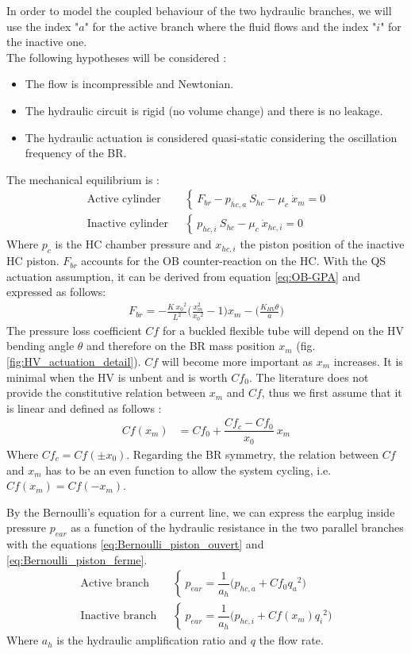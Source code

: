 \documentclass[3p,twocolumn,preprint]{elsarticle}
\begin{document}
In order to model the coupled behaviour of the two hydraulic branches, we will use the index "$a$" for the active branch where the fluid flows and the index "$i$" for the inactive one. \\
The following hypotheses will be considered :
\begin{itemize}
	\item The flow is incompressible and Newtonian.
	\item The hydraulic circuit is rigid (no volume change) and there is no leakage.
	\item The hydraulic actuation is considered quasi-static considering the oscillation frequency of the BR.
\end{itemize}
The mechanical equilibrium is :
\begin{align}
	\text{Active cylinder ~}& \left\{~
	F_{br} - p_{hc,a}\ S_{hc} - \mu_{c}\ \dot{x}_m = 0
	\right.
	\label{eq:equilibre_dynamique_piston_ouvert}\\
	\text{Inactive cylinder ~}& \left\{~
	p_{hc,i}\ S_{hc} - \mu_{c}\ \dot{x}_{hc,i} = 0
	\right.
	\label{eq:equilibre_dynamique_piston_ferme}
\end{align}
Where $p_c$ is the HC chamber pressure and $x_{hc,i}$ the piston position of the inactive HC piston. $F_{br}$ accounts for the OB counter-reaction on the HC. With the QS actuation assumption, it can be derived from equation \ref{eq:OB-GPA} and expressed as follows: 
\begin{align}
	F_{br} = -\frac{K\ {x_0}^2}{L^2}\biggl(\frac{x_m^2}{{x_0}^2} -1\biggr)x_m - \biggl( \frac{K_{HV}\theta}{a} \biggr)
	\label{eq:F_OB_xxxxxx}
\end{align}
The pressure loss coefficient $Cf$ for a buckled flexible tube will depend on the HV bending angle $\theta$ and therefore on the BR mass position $x_m$ (fig. \ref{fig:HV_actuation_detail}). $Cf$ will become more important as $x_m$ increases. It is minimal when the HV is unbent and is worth $Cf_0$. The literature does not provide the constitutive relation between $x_m$ and $Cf$, thus we first assume that it is linear and defined as follows :
\begin{align}
Cf(x_m) & = Cf_0 + \dfrac{Cf_c - Cf_0}{x_0}\ x_m 
\label{eq:Cf(x_m)_linear}
\end{align}
Where $Cf_c=Cf(\pm x_0)$. Regarding the BR symmetry, the relation between $Cf$ and $x_m$ has to be an even function to allow the system cycling, i.e. $Cf(x_m) = Cf(-x_m)$.

By the Bernoulli's equation for a current line, we can express the earplug inside pressure $p_{ear}$ as a function of the hydraulic resistance in the two parallel branches with the equations \ref{eq:Bernoulli_piston_ouvert} and \ref{eq:Bernoulli_piston_ferme}.
\begin{align}
	\text{Active branch ~}& \left\{~
	p_{ear} = \dfrac{1}{a_h}\biggl(p_{hc,a} + Cf_0 {q_a}^2 \biggr)
	\right.
	\label{eq:Bernoulli_piston_ouvert}\\
	\text{Inactive branch ~}& \left\{~
	p_{ear} = \dfrac{1}{a_h}\biggl(p_{hc,i} + Cf(x_m) {q_i}^2 \biggr)
	\right.
	\label{eq:Bernoulli_piston_ferme}
\end{align}
Where $a_h$ is the hydraulic amplification ratio and $q$ the flow rate.
\end{document}
